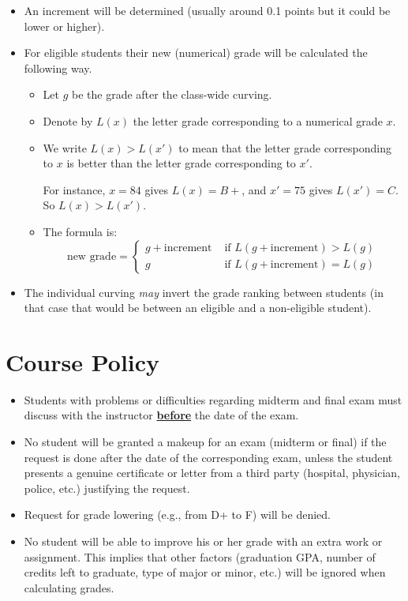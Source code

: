 \documentclass[12]{article}
\begin{document}
\begin{itemize}
\begin{itemize}
\begin{itemize}
  \item An increment will be determined (usually around 0.1 points but
    it could be lower or higher). 
  \item For eligible students their new (numerical) grade will be
    calculated the following way. 

    \begin{itemize}
    \item Let $g$ be the grade after the class-wide curving. 
    \item Denote by $L(x)$  the letter grade corresponding to a numerical
      grade $x$. 
    \item We write $L(x)>L(x')$ to mean that the letter grade corresponding to
      $x$ is better than the  letter grade corresponding to
      $x'$. 

For instance,  $x=84$ gives $L(x)=B+$, and $x'=75$ gives
$L(x')=C$. So $L(x)>L(x')$. 
\item The formula is:
    \begin{equation*}
      \text{new grade} =
      \begin{cases}
        g + \text{increment} & \text{ if } L(g +
        \text{increment})>L(g)\\
        g &\text{ if } L(g +
        \text{increment})=L(g)
      \end{cases}
    \end{equation*}
    \end{itemize}

  \item The individual curving \textit{may} invert the grade ranking
    between students (in that case that would be between an eligible
    and a non-eligible student). 
  \end{itemize}
  \end{itemize}
\end{itemize}


\section*{Course Policy}
\begin{itemize}
    \item Students with problems or difficulties regarding midterm and final exam must discuss with the         instructor \underline{\textbf{before}} the date of the exam.
    \item No student will be granted a makeup for an exam (midterm or final) if the request
  is done after the date of the corresponding exam, unless the student presents a
  genuine certificate or letter from a third party (hospital, physician, police, etc.) justifying the request. 
    \item Request for grade lowering  (e.g., from D+ to F) will be   denied. 
    \item No student will be able to improve his or her grade with an
  extra work or assignment. This implies that other factors (graduation GPA, number of credits left to graduate, type of major or minor, etc.) will be ignored when calculating grades. 
\end{itemize}
\end{document}
